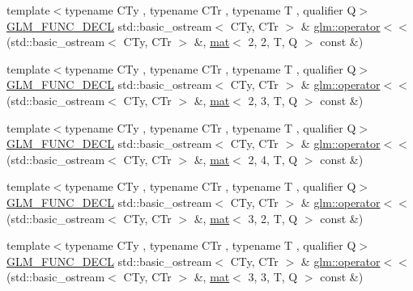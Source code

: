 \begin{DoxyCompactItemize}
\item 
{\footnotesize template$<$typename C\+Ty , typename C\+Tr , typename T , qualifier Q$>$ }\\\hyperlink{setup_8hpp_ab2d052de21a70539923e9bcbf6e83a51}{G\+L\+M\+\_\+\+F\+U\+N\+C\+\_\+\+D\+E\+CL} std\+::basic\+\_\+ostream$<$ C\+Ty, C\+Tr $>$ \& \hyperlink{group__gtx__io_ga9793fc7111cd7d145c369827071f5091}{glm\+::operator$<$$<$} (std\+::basic\+\_\+ostream$<$ C\+Ty, C\+Tr $>$ \&, \hyperlink{structglm_1_1mat}{mat}$<$ 2, 2, T, Q $>$ const \&)
\item 
{\footnotesize template$<$typename C\+Ty , typename C\+Tr , typename T , qualifier Q$>$ }\\\hyperlink{setup_8hpp_ab2d052de21a70539923e9bcbf6e83a51}{G\+L\+M\+\_\+\+F\+U\+N\+C\+\_\+\+D\+E\+CL} std\+::basic\+\_\+ostream$<$ C\+Ty, C\+Tr $>$ \& \hyperlink{group__gtx__io_ga2bf4942715dc303be4a8752a44adce55}{glm\+::operator$<$$<$} (std\+::basic\+\_\+ostream$<$ C\+Ty, C\+Tr $>$ \&, \hyperlink{structglm_1_1mat}{mat}$<$ 2, 3, T, Q $>$ const \&)
\item 
{\footnotesize template$<$typename C\+Ty , typename C\+Tr , typename T , qualifier Q$>$ }\\\hyperlink{setup_8hpp_ab2d052de21a70539923e9bcbf6e83a51}{G\+L\+M\+\_\+\+F\+U\+N\+C\+\_\+\+D\+E\+CL} std\+::basic\+\_\+ostream$<$ C\+Ty, C\+Tr $>$ \& \hyperlink{group__gtx__io_ga79ad9284d3311aad760f84621197c972}{glm\+::operator$<$$<$} (std\+::basic\+\_\+ostream$<$ C\+Ty, C\+Tr $>$ \&, \hyperlink{structglm_1_1mat}{mat}$<$ 2, 4, T, Q $>$ const \&)
\item 
{\footnotesize template$<$typename C\+Ty , typename C\+Tr , typename T , qualifier Q$>$ }\\\hyperlink{setup_8hpp_ab2d052de21a70539923e9bcbf6e83a51}{G\+L\+M\+\_\+\+F\+U\+N\+C\+\_\+\+D\+E\+CL} std\+::basic\+\_\+ostream$<$ C\+Ty, C\+Tr $>$ \& \hyperlink{group__gtx__io_gacd6666708d198e61ac99b5b144aafdf1}{glm\+::operator$<$$<$} (std\+::basic\+\_\+ostream$<$ C\+Ty, C\+Tr $>$ \&, \hyperlink{structglm_1_1mat}{mat}$<$ 3, 2, T, Q $>$ const \&)
\item 
{\footnotesize template$<$typename C\+Ty , typename C\+Tr , typename T , qualifier Q$>$ }\\\hyperlink{setup_8hpp_ab2d052de21a70539923e9bcbf6e83a51}{G\+L\+M\+\_\+\+F\+U\+N\+C\+\_\+\+D\+E\+CL} std\+::basic\+\_\+ostream$<$ C\+Ty, C\+Tr $>$ \& \hyperlink{group__gtx__io_ga4de3d5bb444fa0ef69608fc068e27d0e}{glm\+::operator$<$$<$} (std\+::basic\+\_\+ostream$<$ C\+Ty, C\+Tr $>$ \&, \hyperlink{structglm_1_1mat}{mat}$<$ 3, 3, T, Q $>$ const \&)

\end{DoxyCompactItemize}
